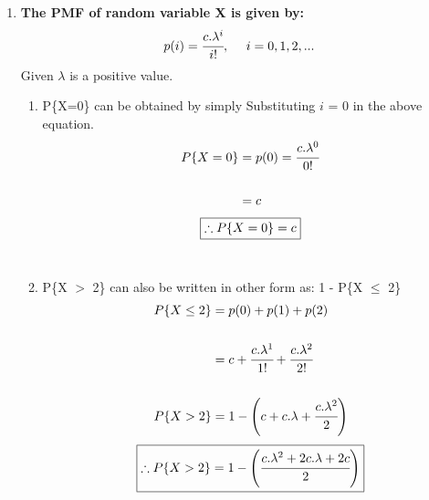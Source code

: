 \documentclass{article}
\begin{document}
\begin{enumerate}
\newpage
\item \textbf{The PMF of random variable X is given by:}
\begin{align*}
  p(i) = \cfrac{c.\lambda^i}{i!},\ \ \ \ i = 0, 1, 2,...\\
\end{align*}
\textnormal{Given $\lambda$ is a positive value.}
  \begin{enumerate}
    \item P\{X=0\} can be obtained by simply Substituting \(i\) = 0 in the above equation.
    \begin{align*}
      P\{X=0\} &= p(0) = \cfrac{c.\lambda^0}{0!}\\\\
      &= c
    \end{align*}
    \[
     \boxed{\therefore P\{X=0\} = c}\\
    \]\\
    \item P\{X \(>\) 2\} can also be written in other form as: 1 - P\{X \(\leq\) 2\}
    \begin{align*}
      P\{X\leq 2\} &= p(0) + p(1) + p(2)\\\\
      &= c + \cfrac{c.\lambda^1}{1!} + \cfrac{c.\lambda^2}{2!}\\\\
      P\{X > 2\} &= 1 - \left(c + c.\lambda + \cfrac{c.\lambda^2}{2}\right)\\
    \end{align*}
    \[
     \boxed{\therefore P\{X > 2\} = 1 - \left(\cfrac{c.\lambda^2 + 2c.\lambda + 2c}{2}\right)}\\
    \]
  \end{enumerate}
\end{enumerate}
\end{document}
